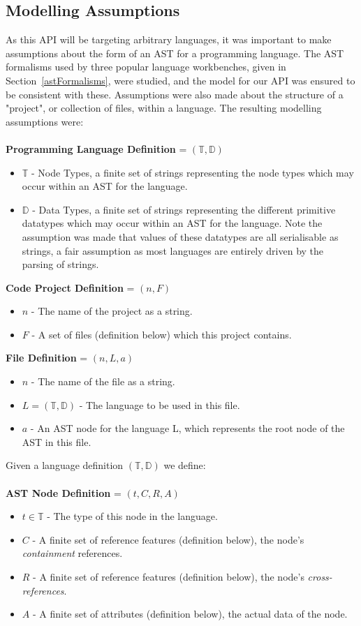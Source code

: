 \documentclass{article}
\begin{document}
\subsection{Modelling Assumptions}\label{apiAssumptions}
As this API will be targeting arbitrary languages, it was important to make assumptions about the form of an AST for a programming language. The AST formalisms used by three popular language workbenches, given in Section~\ref{astFormalisms}, were studied, and the model for our API was ensured to be consistent with these. Assumptions were also made about the structure of a "project", or collection of files, within a language. The resulting modelling assumptions were:
\\
\\
\textbf{Programming Language Definition} = $(\mathbb{T},\mathbb{D})$ 
\begin{itemize}
\item $\mathbb{T}$ - Node Types, a finite set of strings representing the node types which may occur within an AST for the language.
\item $\mathbb{D}$ - Data Types, a finite set of strings representing the different primitive datatypes which may occur within an AST for the language. Note the assumption was made that values of these datatypes are all serialisable as strings, a fair assumption as most languages are entirely driven by the parsing of strings.
\end{itemize}
%
\textbf{Code Project Definition} = $(n,F )$ 
\begin{itemize}
\item $n$ - The name of the project as a string.
\item $F$ - A set of files (definition below) which this project contains.
\end{itemize}
%
\textbf{File Definition} = $(n, L, a)$ 
\begin{itemize}
\item $n$ - The name of the file as a string.
\item $L=(\mathbb{T},\mathbb{D})$ - The language to be used in this file.
\item $a$ - An AST node for the language L, which represents the root node of the AST in this file.
\end{itemize}
%
Given a language definition $(\mathbb{T},\mathbb{D})$ we define:\\
\\
\textbf{AST Node Definition} = $(t,C,R,A)$ 
\begin{itemize}
\item $t\in \mathbb{T}$ - The type of this node in the language.
\item $C$ - A finite set of reference features (definition below), the node's \emph{containment} references.
\item $R$ - A finite set of reference features (definition below), the node's \emph{cross-references}.
\item $A$ - A finite set of attributes (definition below), the actual data of the node.
\end{itemize}
\end{document}
